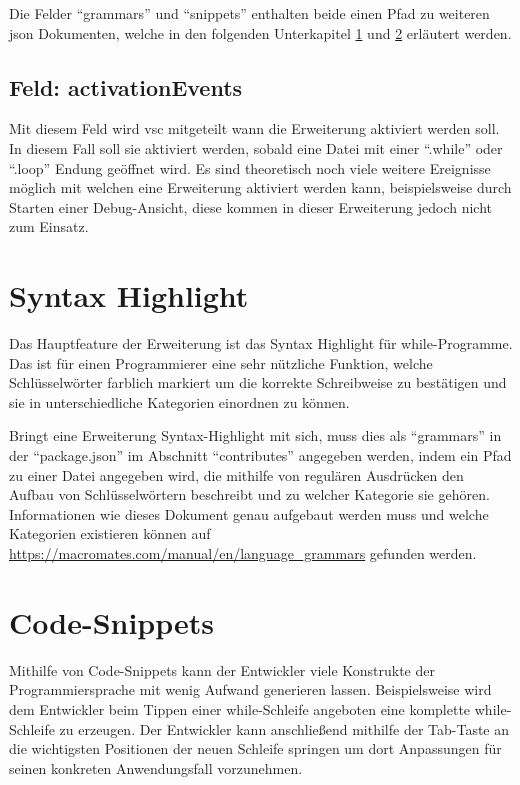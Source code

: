 Die Felder \enquote{grammars} und \enquote{snippets} enthalten beide einen Pfad zu weiteren \ac{json} Dokumenten, welche in den folgenden Unterkapitel \ref{sec:SyntaxHighlight} und \ref{sec:code-snippet} erläutert werden. 


\subsection{Feld: activationEvents}
Mit diesem Feld wird \ac{vsc} mitgeteilt wann die Erweiterung aktiviert werden soll. In diesem Fall soll sie aktiviert werden, sobald eine Datei mit einer \enquote{.while} oder \enquote{.loop} Endung geöffnet wird. Es sind theoretisch noch viele weitere Ereignisse möglich mit welchen eine Erweiterung aktiviert werden kann, beispielsweise durch Starten einer Debug-Ansicht, diese kommen in dieser Erweiterung jedoch nicht zum Einsatz.

\section{Syntax Highlight}\label{sec:SyntaxHighlight}
Das Hauptfeature der Erweiterung ist das Syntax Highlight für while-Programme. Das ist für einen Programmierer eine sehr nützliche Funktion, welche Schlüsselwörter farblich markiert um die korrekte Schreibweise zu bestätigen und sie in unterschiedliche Kategorien einordnen zu können.

Bringt eine Erweiterung Syntax-Highlight mit sich, muss dies als \enquote{grammars} in der \enquote{package.json} im Abschnitt \enquote{contributes} angegeben werden, indem ein Pfad zu einer Datei angegeben wird, die mithilfe von regulären Ausdrücken den Aufbau von Schlüsselwörtern beschreibt und zu welcher Kategorie sie gehören. Informationen wie dieses Dokument genau aufgebaut werden muss und welche Kategorien existieren können auf \url{https://macromates.com/manual/en/language_grammars} gefunden werden.

\section{Code-Snippets}\label{sec:code-snippet}
Mithilfe von Code-Snippets kann der Entwickler viele Konstrukte der Programmiersprache mit wenig Aufwand generieren lassen. Beispielsweise wird dem Entwickler beim Tippen einer while-Schleife angeboten eine komplette while-Schleife zu erzeugen. Der Entwickler kann anschließend mithilfe der Tab-Taste an die wichtigsten Positionen der neuen Schleife springen um dort Anpassungen für seinen konkreten Anwendungsfall vorzunehmen.

